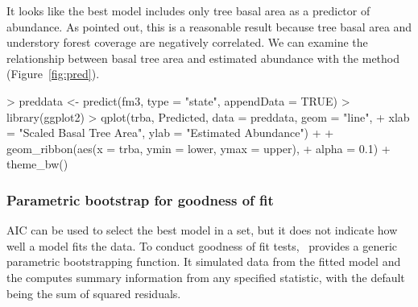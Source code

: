 \documentclass[article,shortnames]{jss}
\newcommand{\um}{\pkg{unmarked}}
\begin{document}
It looks like the best model includes only tree basal area as a
predictor of abundance.  As \citet{Royle2004a} pointed out, this is a
reasonable result because tree basal area and understory forest
coverage are negatively correlated.  We can examine the relationship
between basal tree area and estimated abundance
with the  method (Figure~\ref{fig:pred}).



\begin{Schunk}
\begin{Sinput}
> preddata <- predict(fm3, type = "state", appendData = TRUE)
> library(ggplot2)
> qplot(trba, Predicted, data = preddata, geom = "line", 
+     xlab = "Scaled Basal Tree Area", ylab = "Estimated Abundance") + 
+     geom_ribbon(aes(x = trba, ymin = lower, ymax = upper), 
+         alpha = 0.1) + theme_bw()
\end{Sinput}
\end{Schunk}



\subsubsection{Parametric bootstrap for goodness of fit}

AIC can be used to select the best model in a set, but it does not indicate
how well a model fits the data.  
To conduct goodness of fit tests, \um\ provides a generic
parametric bootstrapping function.  It simulated data from the fitted
model and the computes summary information from any specified
statistic, with the default being the sum of squared residuals.
\end{document}

